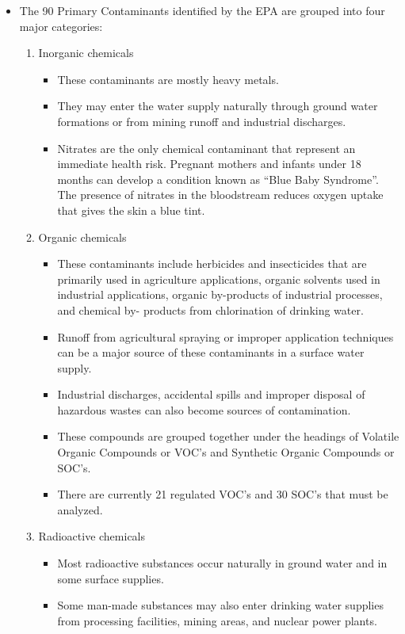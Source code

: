 \begin{itemize}
\begin{itemize}
\begin{enumerate}
\begin{itemize}
\item The 90 Primary Contaminants identified by the EPA are grouped into four major categories:
\begin{enumerate}
\item Inorganic chemicals
\begin{itemize}
\item These contaminants are mostly heavy metals. 
\item They may enter the water supply naturally through ground water formations or from mining runoff and industrial discharges.
\item Nitrates are the only chemical contaminant that represent an immediate health risk. Pregnant mothers and infants under 18 months can develop a condition known as “Blue Baby Syndrome”. The presence of nitrates in the bloodstream reduces oxygen uptake that gives the skin a blue tint.
\end{itemize}
\item Organic chemicals
\begin{itemize}
\item These contaminants include herbicides and insecticides that are primarily used in agriculture applications, organic solvents used in industrial applications, organic by-products of industrial processes, and chemical by- products from chlorination of drinking water.
\item Runoff from agricultural spraying or improper application techniques can be a major source of these contaminants in a surface water supply.
\item Industrial discharges, accidental spills and improper disposal of hazardous wastes can also become sources of contamination.
\item These compounds are grouped together under the headings of Volatile Organic Compounds or VOC’s and Synthetic Organic Compounds or SOC’s. 

\item There are currently 21 regulated VOC’s and 30 SOC’s that must be analyzed.
\end{itemize}
\item Radioactive chemicals
\begin{itemize}
\item Most radioactive substances occur naturally in ground water and in some surface supplies. 
\item Some man-made substances may also enter drinking water supplies from processing facilities, mining areas, and nuclear power plants. 
\end{itemize}


\end{enumerate}
\end{itemize}
\end{enumerate}
\end{itemize}
\end{itemize}
